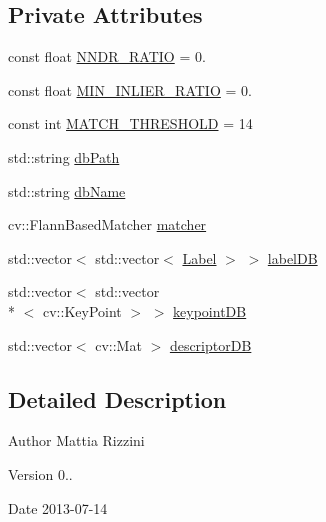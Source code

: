 \subsection*{Private Attributes}
\begin{DoxyCompactItemize}
\item 
const float \hyperlink{class_i_stuff_1_1_database_ade8d4afb9ec5e100de098777257d192c}{N\-N\-D\-R\-\_\-\-R\-A\-T\-I\-O} = 0.
\item 
const float \hyperlink{class_i_stuff_1_1_database_a11bb91e98d0c0a6640b69c699f22999a}{M\-I\-N\-\_\-\-I\-N\-L\-I\-E\-R\-\_\-\-R\-A\-T\-I\-O} = 0.
\item 
const int \hyperlink{class_i_stuff_1_1_database_addc638b6be97feec274eb995ffd1d937}{M\-A\-T\-C\-H\-\_\-\-T\-H\-R\-E\-S\-H\-O\-L\-D} = 14
\item 
std\-::string \hyperlink{class_i_stuff_1_1_database_ae648dcc6da59f19955681584028fef99}{db\-Path}
\item 
std\-::string \hyperlink{class_i_stuff_1_1_database_a4e8d5c6cbf4e5eaafe379cd5762fd76f}{db\-Name}
\item 
cv\-::\-Flann\-Based\-Matcher \hyperlink{class_i_stuff_1_1_database_a871b6feeaa1b3d1e75d3b4b8edb86a84}{matcher}
\item 
std\-::vector$<$ std\-::vector$<$ \hyperlink{struct_i_stuff_1_1_label}{Label} $>$ $>$ \hyperlink{class_i_stuff_1_1_database_a6d83fe3176ec13b1847ab7600e8e230c}{label\-D\-B}
\item 
std\-::vector$<$ std\-::vector\\*
$<$ cv\-::\-Key\-Point $>$ $>$ \hyperlink{class_i_stuff_1_1_database_a9e5ee68bf2517bcc87fa38b3519897ee}{keypoint\-D\-B}
\item 
std\-::vector$<$ cv\-::\-Mat $>$ \hyperlink{class_i_stuff_1_1_database_a6af39e0cf95b7a14c331911bf388bf65}{descriptor\-D\-B}
\end{DoxyCompactItemize}


\subsection{Detailed Description}
\begin{DoxyAuthor}{Author}
Mattia Rizzini 
\end{DoxyAuthor}
\begin{DoxyVersion}{Version}
0.. 
\end{DoxyVersion}
\begin{DoxyDate}{Date}
2013-\/07-\/14 
\end{DoxyDate}


